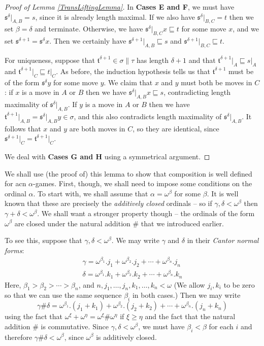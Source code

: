 \documentclass[11pt]{article} %
\theoremstyle{plain} %
\theoremstyle{definition} %
\theoremstyle{note}
\theoremstyle{exercisestyle}
\newcommand{\s}{\mathfrak s}
\renewcommand{\t}{\mathfrak t}
\newcommand{\prefix}{\sqsubseteq}
\begin{document}
\begin{proof}[Proof of Lemma \ref{TransLiftingLemma}]
  In \textbf{Cases E and F}, we must have $\s^\delta\vert_{A,B}=s$, since it is already length maximal.  If we also have $\s^\delta\vert_{B,C}=t$ then we set $\beta=\delta$ and terminate.  Otherwise, we have $\s^\delta\vert_{B,C}x\prefix t$ for some move $x$, and we set $\s^{\delta+1}=\s^\delta x$.  Then we certainly have $\s^{\delta+1}\vert_{A,B}\prefix s$ and $\s^{\delta+1}\vert_{B,C}\prefix t$.  

  For uniqueness, suppose that $\t^{\delta+1}\in\sigma\|\tau$ has length $\delta+1$ and that $\t^{\delta+1}\vert_A\prefix s\vert_A$ and $\t^{\delta+1}\vert_C\prefix t\vert_C$.  As before, the induction hypothesis tells us that $\t^{\delta+1}$ must be of the form $\s^\delta y$ for some move $y$.  We claim that $x$ and $y$ must both be moves in $C$: if $x$ is a move in $A$ or $B$ then we have $\s^\delta\vert_{A,B}x\prefix s$, contradicting length maximality of $\s^\delta\vert_{A,B}$.  If $y$ is a move in $A$ or $B$ then we have $\t^{\delta+1}\vert_{A,B}=\s^\delta\vert_{A,B}y\in\sigma$, and this also contradicts length maximality of $\s^\delta\vert_{A,B}$.  It follows that $x$ and $y$ are both moves in $C$, so they are identical, since $\s^{\delta+1}\vert_C=\t^{\delta+1}\vert_C$.

  We deal with \textbf{Cases G and H} using a symmetrical argument.
\end{proof}

We shall use (the proof of) this lemma to show that composition is well defined for acn $\alpha$-games.  First, though, we shall need to impose some conditions on the ordinal $\alpha$.  To start with, we shall assume that $\alpha=\omega^\beta$ for some $\beta$.  It is well known that these are precisely the \emph{additively closed} ordinals -- so if $\gamma,\delta<\omega^\beta$ then $\gamma+\delta<\omega^\beta$.  We shall want a stronger property though -- the ordinals of the form $\omega^\beta$ are closed under the natural addition $\#$ that we introduced earlier.

To see this, suppose that $\gamma,\delta<\omega^\beta$.  We may write $\gamma$ and $\delta$ in their \emph{Cantor normal forms}:
\begin{gather*}
  \gamma = \omega^{\beta_1}.j_1 + \omega^{\beta_2}.j_2 + \cdots + \omega^{\beta_n}.j_n \\
  \delta = \omega^{\beta_1}.k_1 + \omega^{\beta_2}.k_2 + \cdots + \omega^{\beta_n}.k_n
\end{gather*}
Here, $\beta_1>\beta_2>\cdots>\beta_n$, and $n,j_1,\dots,j_n,k_1,\dots,k_n<\omega$ (We allow $j_i,k_i$ to be zero so that we can use the same sequence $\beta_i$ in both cases.)  Then we may write
\[
  \gamma\#\delta = \omega^{\beta_1}.(j_1+k_1) + \omega^{\beta_2}.(j_2+k_2) + \cdots + \omega^{\beta_n}.(j_n+k_n)
  \]
using the fact that $\omega^\xi+\omega^\eta=\omega^\xi\#\omega^\eta$ if $\xi\ge\eta$ and the fact that the natural addition $\#$ is commutative.  Since $\gamma,\delta<\omega^\beta$, we must have $\beta_i<\beta$ for each $i$ and therefore $\gamma\#\delta<\omega^\beta$, since $\omega^\beta$ is additively closed.
\end{document}
